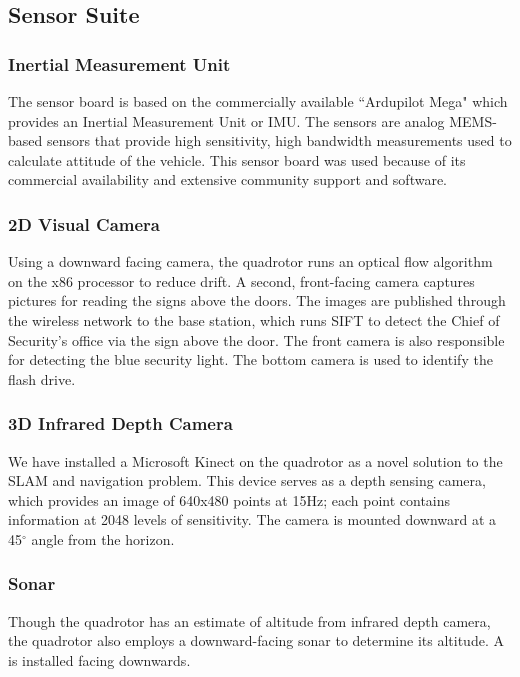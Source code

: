 \documentclass[12pt, letterpaper]{article}
\begin{document}
\subsection{Sensor Suite}

\subsubsection{Inertial Measurement Unit}

The sensor board is based on the commercially available ``Ardupilot Mega" which provides an Inertial Measurement Unit or IMU. The sensors are analog MEMS-based sensors that provide high sensitivity, high bandwidth measurements used to calculate attitude of the vehicle. This sensor board was used because of its commercial availability and extensive community support and software.

\subsubsection{2D Visual Camera}

Using a downward facing camera, the quadrotor runs an optical flow algorithm on the x86 processor to reduce drift.  A second, front-facing camera captures pictures for reading the signs above the doors.  The images are published through the wireless network to the base station, which runs SIFT to detect the Chief of Security's office via the sign above the door. The front camera is also responsible for detecting the blue security light.  The bottom camera is used to identify the flash drive.

\subsubsection{3D Infrared Depth Camera}

We have installed a Microsoft Kinect on the quadrotor as a novel solution to the SLAM and navigation problem. This device serves as a depth sensing camera, which provides an image of 640x480 points at 15Hz; each point contains information at 2048 levels of sensitivity. The camera is mounted downward at a 45$^\circ$ angle from the horizon.

\subsubsection{Sonar}

Though the quadrotor has an estimate of altitude from infrared depth camera, the quadrotor also employs a downward-facing sonar to determine its altitude. A  is installed facing downwards. 
\end{document}
